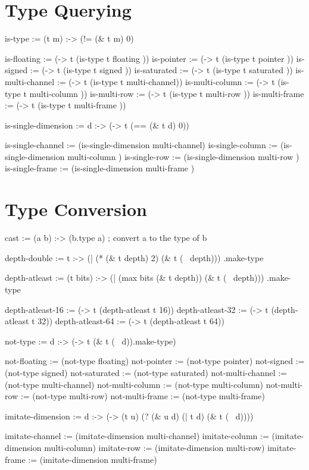 \documentclass[twoside=false, numbers=noenddot]{scrbook}
\newenvironment{likely}
{ \verbatim }
{ \endverbatim }
\begin{document}
\section{Type Querying}
\begin{likely}
is-type :=
 (t m) :->
   (!= (& t m) 0)

is-floating      := (-> t (is-type t floating     ))
is-pointer       := (-> t (is-type t pointer      ))
is-signed        := (-> t (is-type t signed       ))
is-saturated     := (-> t (is-type t saturated    ))
is-multi-channel := (-> t (is-type t multi-channel))
is-multi-column  := (-> t (is-type t multi-column ))
is-multi-row     := (-> t (is-type t multi-row    ))
is-multi-frame   := (-> t (is-type t multi-frame  ))

is-single-dimension :=
  d :->
   (-> t (== (& t d) 0))

is-single-channel := (is-single-dimension multi-channel)
is-single-column  := (is-single-dimension multi-column )
is-single-row     := (is-single-dimension multi-row    )
is-single-frame   := (is-single-dimension multi-frame  )
\end{likely}

\section{Type Conversion}
\begin{likely}
cast :=
  (a b) :->
    (b.type a) ; convert a to the type of b

depth-double :=
  t :->
    (| (* (& t depth) 2) (& t (~ depth)))
   .make-type

depth-atleast :=
  (t bits) :->
    (| (max bits (& t depth)) (& t (~ depth)))
   .make-type

depth-atleast-16 := (-> t (depth-atleast t 16))
depth-atleast-32 := (-> t (depth-atleast t 32))
depth-atleast-64 := (-> t (depth-atleast t 64))

not-type :=
  d :->
    (-> t (& t (~ d)).make-type)

not-floating      := (not-type floating)
not-pointer       := (not-type pointer)
not-signed        := (not-type signed)
not-saturated     := (not-type saturated)
not-multi-channel := (not-type multi-channel)
not-multi-column  := (not-type multi-column)
not-multi-row     := (not-type multi-row)
not-multi-frame   := (not-type multi-frame)

imitate-dimension :=
  d :->
    (-> (t u) (? (& u d) (| t d) (& t (~ d))))

imitate-channel := (imitate-dimension multi-channel)
imitate-column  := (imitate-dimension multi-column)
imitate-row     := (imitate-dimension multi-row)
imitate-frame   := (imitate-dimension multi-frame)
\end{likely}
\end{document}
